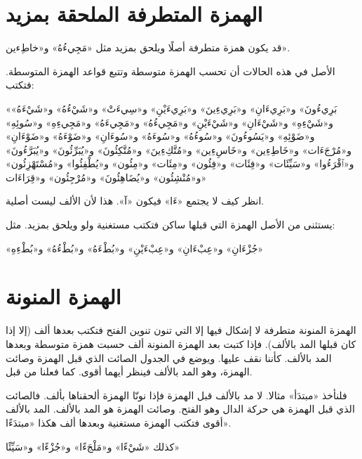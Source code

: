 \documentclass[
  english,
  10pt,
]{article}
\begin{document}
\section{\texorpdfstring{\foreignlanguage{arabic}{\altfamily الهمزة
المتطرفة الملحقة
بمزيد}}{الهمزة المتطرفة الملحقة بمزيد}}\label{ux627ux644ux647ux645ux632ux629-ux627ux644ux645ux62aux637ux631ux641ux629-ux627ux644ux645ux644ux62dux642ux629-ux628ux645ux632ux64aux62f}

\begin{otherlanguage}{arabic}

\altfamily 

قد يكون همزة متطرفة أصلًا ويلحق بمزيد مثل «مَجِيءُهُ» و«خاطِءين».

الأصل في هذه الحالات أن تحسب الهمزة متوسطة وتتبع قواعد الهمزة المتوسطة.
فتكتب:

«بَرِيءُونَ» و«بَرِيءَانِ» و«بَرِيءِينَ» و«بَرِيءَيْنِ» و«سِيءَتْ» و«شَيْءُهُ» و«شَيْءَهُ» و«شَيْءِهِ»
و«شَيْءَانِ» و«شَيْءَيْنِ» و«مَجِيءُهُ» و«مَجِيءَهُ» و«مَجِيءِهِ» و«سُوئِهِ» و«ضَوْئِهِ» و«يَسُوءُونَ»
و«سُوءُهُ» و«سُوءَهُ» و«سُوءَانِ» و«ضَوْءَهُ» و«ضَوْءَانِ» و«مُرْجَءَات» و«خَاطِءِين» و«خَاسِءِين»
و«مُتَّكِءِينَ» و«مُتَّكِئُونَ» و«يُبَرِّئُونَ» و«يُبَرَّءُونَ» و«ٱقْرَءُوا» و«سَيِّئَات» و«فِئَات»
و«فِئُون» و«مِئَات» و«مِئُون» و«يُطْفِئُوا» و«مُسْتَهْزِئُون» و«مُنْشِئُون» و«يُضَاهِئُونَ»
و«مُرْجِئُون» و«قِرَاءَات»

انظر كيف لا يجتمع «ءَا» فيكون «آ». هذا لأن الألف ليست أصلية.

يستثنى من الأصل الهمزة التي قبلها ساكن فتكتب مستغنية ولو ويلحق بمزيد.
مثل:

«جُزْءَانِ» و«عِبْءَانِ» و«عِبْءَيْنِ» و«بُطْءَهُ» و«بُطْءُهُ» و«بُطْءِهِ»

\end{otherlanguage}

\section{\texorpdfstring{\foreignlanguage{arabic}{\altfamily الهمزة
المنونة}}{الهمزة المنونة}}\label{ux627ux644ux647ux645ux632ux629-ux627ux644ux645ux646ux648ux646ux629}

\begin{otherlanguage}{arabic}

\altfamily 

الهمزة المنونة متطرفة لا إشكال فيها إلا التي تنون تنوين الفتح فتكتب
بعدها ألف (إلا إذا كان قبلها المد بالألف). فإذا كتبت بعد الهمزة المنونة
ألف حسبت همزة متوسطة وبعدها المد بالألف. كأننا نقف عليها. ويوضع في
الجدول الصائت الذي قبل الهمزة وصائت الهمزة، وهو المد بالألف فينظر أيهما
أقوى. كما فعلنا من قبل.

فلنأخذ «مبتدَأ» مثالا. لا مد بالألف قبل الهمزة فإذا نونّا الهمزة ألحقناها
بألف. فالصائت الذي قبل الهمزة هي حركة الدال وهو الفتح. وصائت الهمزة هو
المد بالألف. المد بالألف أقوى فتكتب الهمزة مستغنية وبعدها ألف هكذا
«مبتدَءًا».

كذلك «شَيْءًا» و«مَلْجَءًا» و«جُزْءًا» و«سَيِّئًا»

\end{otherlanguage}
\end{document}
